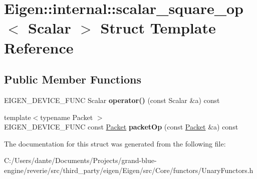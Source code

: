 \hypertarget{struct_eigen_1_1internal_1_1scalar__square__op}{}\section{Eigen\+::internal\+::scalar\+\_\+square\+\_\+op$<$ Scalar $>$ Struct Template Reference}
\label{struct_eigen_1_1internal_1_1scalar__square__op}
\subsection*{Public Member Functions}
\begin{DoxyCompactItemize}
\item 
\mbox{\label{struct_eigen_1_1internal_1_1scalar__square__op_adc6cc27e7ed7e04a847e1de00556f971}} 
E\+I\+G\+E\+N\+\_\+\+D\+E\+V\+I\+C\+E\+\_\+\+F\+U\+NC Scalar {\bfseries operator()} (const Scalar \&a) const
\item 
\mbox{\label{struct_eigen_1_1internal_1_1scalar__square__op_ab06f4cf9058ffb23b520a1d107904ddb}} 
{\footnotesize template$<$typename Packet $>$ }\\E\+I\+G\+E\+N\+\_\+\+D\+E\+V\+I\+C\+E\+\_\+\+F\+U\+NC const \mbox{\hyperlink{union_eigen_1_1internal_1_1_packet}{Packet}} {\bfseries packet\+Op} (const \mbox{\hyperlink{union_eigen_1_1internal_1_1_packet}{Packet}} \&a) const
\end{DoxyCompactItemize}


The documentation for this struct was generated from the following file\+:\begin{DoxyCompactItemize}
\item 
C\+:/\+Users/dante/\+Documents/\+Projects/grand-\/blue-\/engine/reverie/src/third\+\_\+party/eigen/\+Eigen/src/\+Core/functors/Unary\+Functors.\+h\end{DoxyCompactItemize}
